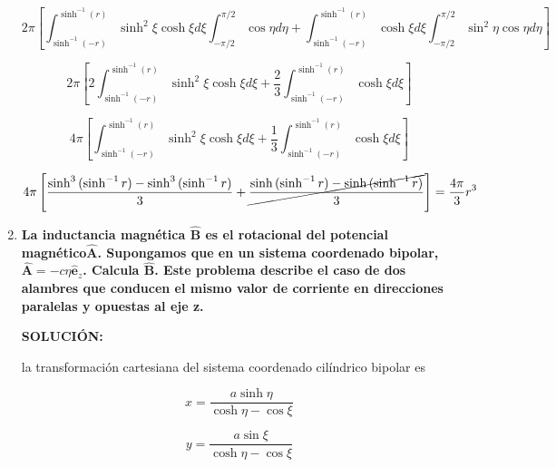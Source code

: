 \documentclass[12pt,a4paper]{article}
\begin{document}
\begin{enumerate}
    \begin{equation*}
        2\pi\left[\int_{\sinh^{-1}{(-r)}}^{\sinh^{-1}{(r)}}\sinh^2{\xi}\cosh{\xi} d\xi \int_{-\pi /2}^{\pi/2} \cos{\eta} d\eta +\int_{\sinh^{-1}{(-r)}}^{\sinh^{-1}{(r)}}\cosh{\xi} d \xi\int_{-\pi /2}^{\pi/2}\sin^2{\eta}\cos{\eta} d\eta\right]
    \end{equation*}
    
    \begin{equation*}
        2\pi\left[2\int_{\sinh^{-1}{(-r)}}^{\sinh^{-1}{(r)}}\sinh^2{\xi}\cosh{\xi} d\xi +\frac{2}{3}\int_{\sinh^{-1}{(-r)}}^{\sinh^{-1}{(r)}}\cosh{\xi} d \xi \right]
    \end{equation*}
    
    \begin{equation*}
        4\pi\left[\int_{\sinh^{-1}{(-r)}}^{\sinh^{-1}{(r)}}\sinh^2{\xi}\cosh{\xi} d\xi +\frac{1}{3}\int_{\sinh^{-1}{(-r)}}^{\sinh^{-1}{(r)}}\cosh{\xi} d \xi \right]
    \end{equation*}
    
    \begin{equation*}
        4\pi\left[\frac{\sinh^3{(\sinh^{-1}{r})}- \sinh^3{(\sinh^{-1}{r})}}{3} +\cancel{\frac{\sinh{(\sinh^{-1}{r})}- \sinh{(\sinh^{-1}{r})}}{3}}\right]= \frac{4\pi}{3}r^3
    \end{equation*}
    
    
    



    \item \textbf{La inductancia magnética $\hat{\mathbf{B}}$ es el rotacional del potencial magnético$\hat{\mathbf{A}}$. Supongamos que en un sistema coordenado bipolar, $\hat{\mathbf{A}} = - c \eta \hat{\mathbf{e}}_z$. Calcula $\hat{\mathbf{B}}$. Este problema describe el caso de dos alambres que conducen el mismo valor de corriente en direcciones paralelas y opuestas al eje z.}
    
    \textbf{SOLUCIÓN:}
    
    la transformación cartesiana del sistema coordenado cilíndrico bipolar es
    
    \begin{equation*}
        x = \frac{a \sinh{\eta}}{\cosh{\eta}- \cos{\xi}}
    \end{equation*}
    
    \begin{equation*}
        y = \frac{a \sin{\xi}}{\cosh{\eta}- \cos{\xi}}
    \end{equation*}
    

\end{enumerate}
\end{document}
